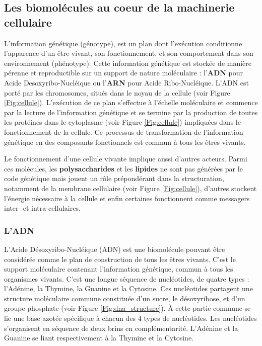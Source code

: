 \subsection{Les biomolécules au coeur de la machinerie cellulaire}

L'information génétique (génotype), est un plan dont l'exécution conditionne l'apparence d'un être vivant, son fonctionnement, et son comportement dans son environnement (phénotype). Cette information génétique est stockée de manière pérenne et reproductible sur un support de nature moléculaire : l'\textbf{ADN} pour Acide Desoxyribo-Nucléique ou l'\textbf{ARN} pour Acide Ribo-Nucléique. L'ADN est porté par les chromosomes, situés dans le noyau de la cellule (voir Figure \ref{Fig:cellule}).
L'exécution de ce plan s'effectue à l'échelle moléculaire et commence par la lecture de l'information génétique et se termine par la production de toutes les protéines dans le cytoplasme (voir Figure \ref{Fig:cellule}) impliquées dans le fonctionnement de la cellule. Ce processus de transformation de l'information génétique en des composants fonctionnels est commun à tous les êtres vivants.

Le fonctionnement d'une cellule vivante implique aussi d'autres acteurs. Parmi ces molécules, les \textbf{polysaccharides} et les \textbf{lipides} ne sont pas générées par le code génétique mais jouent un rôle prépondérant dans la structuration, notamment de la membrane cellulaire (voir Figure \ref{Fig:cellule}), d'autres stockent l'énergie nécessaire à la cellule et enfin certaines fonctionnent comme messagers inter- et intra-cellulaires.


\subsubsection{L'ADN}

L'Acide Désoxyribo-Nucléique (ADN) est une biomolécule pouvant être considérée comme le plan de construction de tous les êtres vivants. C'est le support moléculaire contenant l'information génétique, commun à tous les organismes vivants. C'est une longue séquence de nucléotides, de quatre types : l'Adénine, la Thymine, la Guanine et la Cytosine. Ces nucléotides partagent une structure moléculaire commune constituée d'un sucre, le désoxyribose, et d'un groupe phosphate (voir Figure \ref{Fig:dna_structure}). À cette partie commune se lie une base azotée spécifique à chacun des 4 types de nucléotides. Les nucléotides s'organisent en séquence de deux brins en complémentarité. L'Adénine et la Guanine se liant respectivement à la Thymine et la Cytosine.

